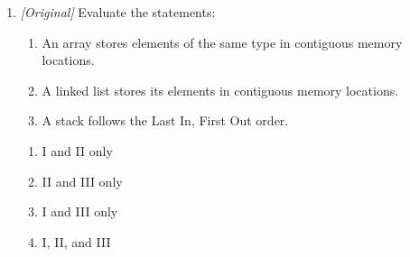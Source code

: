 \begin{enumerate}[label=\textbf{Q\arabic*.}, leftmargin=*]
\item \textit{[Original]} Evaluate the statements:
  \begin{enumerate}[label=\Roman*.]
    \item An array stores elements of the same type in contiguous memory
      locations.
    \item A linked list stores its elements in contiguous memory locations.
    \item A stack follows the Last In, First Out order.
  \end{enumerate}
  \begin{enumerate}[label=\Alph*.]
    \item I and II only
    \item II and III only
    \item I and III only
    \item I, II, and III
  \end{enumerate}


\end{enumerate}
